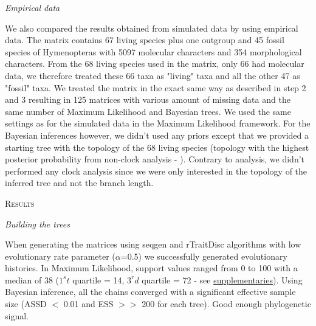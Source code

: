 \documentclass[12pt,letterpaper]{article}
\renewcommand{\section}[1]{%
\bigskip
\begin{center}
\begin{Large}
\normalfont\scshape #1
\medskip
\end{Large}
\end{center}}
\renewcommand{\subsection}[1]{%
\bigskip
\begin{center}
\begin{large}
\normalfont\itshape #1
\end{large}
\end{center}}
\begin{document}
\subsection{Empirical data} %
We also compared the results obtained from simulated data by using \citet{ronquista2012} empirical data.
The matrix contains 67 living species plus one outgroup and 45 fossil species of Hymenopteras with 5097 molecular characters and 354 morphological characters.
From the 68 living species used in the matrix, only 66 had molecular data, we therefore treated these 66 taxa as "living" taxa and all the other 47 as "fossil" taxa.
We treated the matrix in the exact same way as described in step 2 and 3 resulting in 125 matrices with various amount of missing data and the same number of Maximum Likelihood and Bayesian trees.
We used the same settings as for the simulated data in the Maximum Likelihood framework.
For the Bayesian inferences however, we didn’t used any priors except that we provided a starting tree with the topology of the 68 living species (topology with the highest posterior probability from non-clock analysis - \citet{ronquista2012}).
Contrary to \citet{ronquista2012} analysis, we didn’t performed any clock analysis since we were only interested in the topology of the inferred tree and not the branch length.


%
%


\section{Results}
\subsection{Building the trees}
When generating the matrices using seqgen and rTraitDisc algorithms with low evolutionary rate parameter ($\alpha$=0.5) we successfully generated evolutionary histories.
In Maximum Likelihood, support values ranged from 0 to 100 with a median of 38 ($1^st$ quartile = 14, $3^rd$ quartile = 72 - see \hyperref[supplementaries]{supplementaries}). %
Using Bayesian inference, all the chains converged with a significant effective sample size (ASSD $<$ 0.01 and ESS $>>$ 200 for each tree).
Good enough phylogenetic signal.

\end{document}

